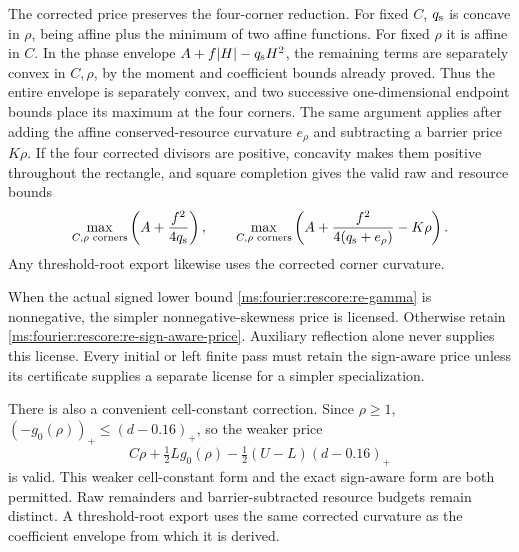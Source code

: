 The corrected price preserves the four-corner reduction. For fixed $C$,
$q_{\rm s}$ is concave in $\rho$, being affine plus the minimum of two
affine functions. For fixed $\rho$ it is affine in $C$. In the phase
envelope $A+f|H|-q_{\rm s}H^2$, the remaining terms are separately
convex in $C,\rho$, by the moment and coefficient bounds already proved.
Thus the entire envelope is separately convex, and two successive
one-dimensional endpoint bounds place its maximum at the four corners.
The same argument applies after adding the affine conserved-resource
curvature $e_\rho$ and subtracting a barrier price $K\rho$.
If the four corrected divisors are positive, concavity makes them
positive throughout the rectangle, and square completion gives the
valid raw and resource bounds
\[
 \max_{C,\rho\text{ corners}}\left(A+\frac{f^2}{4q_{\rm s}}\right),
 \qquad
 \max_{C,\rho\text{ corners}}
       \left(A+\frac{f^2}{4(q_{\rm s}+e_\rho)}-K\rho\right).
\]
Any threshold-root export likewise uses the corrected corner curvature.

When the actual signed lower bound \eqref{ms:fourier:rescore:re-gamma} is nonnegative,
the simpler nonnegative-skewness price is licensed. Otherwise retain
\eqref{ms:fourier:rescore:re-sign-aware-price}. Auxiliary reflection alone never supplies
this license. Every initial or left finite pass must retain the sign-aware price
unless its certificate supplies a separate license for a simpler
specialization.

There is also a convenient cell-constant correction. Since $\rho\ge1$,
$(-g_0(\rho))_+\le(d-0.16)_+$, so the weaker price
\[
 C\rho+\tfrac12L g_0(\rho)
       -\tfrac12(U-L)(d-0.16)_+
\]
is valid. This weaker cell-constant form and the exact sign-aware form are both
permitted. Raw remainders and barrier-subtracted resource budgets remain
distinct. A threshold-root export uses the same corrected curvature as
the coefficient envelope from which it is derived.

